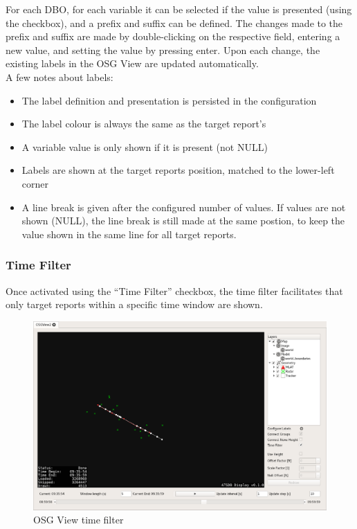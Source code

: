 {For each DBO, for each variable it can be selected if the value is presented (using the checkbox), and a prefix and suffix can be defined. The changes made to the prefix and suffix are made by double-clicking on the respective field, entering a new value, and setting the value by pressing enter. Upon each change, the existing labels in the OSG View are updated automatically. \\

A few notes about labels:

\begin{itemize}
 \item The label definition and presentation is persisted in the configuration
 \item The label colour is always the same as the target report's
 \item A variable value is only shown if it is present (not NULL)
 \item Labels are shown at the target reports position, matched to the lower-left corner
 \item A line break is given after the configured number of values. If values are not shown (NULL), the line break is still made at the same postion, to keep the value shown in the same line for all target reports.
\end{itemize}

\subsubsection{Time Filter}

Once activated using the ``Time Filter'' checkbox,  the time filter facilitates that only target reports within a specific time window are shown.


\begin{figure}[H]
    \hspace*{-2cm}
    \includegraphics[width=18cm,frame]{../screenshots/osgview_time_filter.png}
  \caption{OSG View time filter}
  \label{fig:osgview_time_filter}
\end{figure}

}

